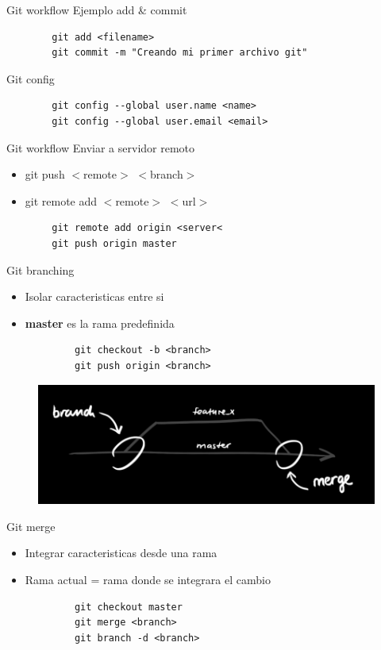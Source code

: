 \documentclass{beamer}
\begin{document}
\begin{frame}[fragile]{Git workflow}
	Ejemplo add \& commit
	\begin{verbatim}
		git add <filename>
		git commit -m "Creando mi primer archivo git"
	\end{verbatim}	
\end{frame}

\begin{frame}[fragile]{Git config}
	\begin{verbatim}
		git config --global user.name <name>
		git config --global user.email <email>
	\end{verbatim}	
\end{frame}


\begin{frame}[fragile]{Git workflow}
	Enviar a servidor remoto
	\begin{itemize}
	\item git push $<$remote$>$ $<$branch$>$
	\item git remote add $<$remote$>$ $<$url$>$
	\end{itemize}
	\begin{verbatim}
		git remote add origin <server<
		git push origin master
	\end{verbatim}
\end{frame}


\begin{frame}[fragile]{Git branching}	
	\begin{itemize}
	\item Isolar caracteristicas entre si
	\item \textbf{master} es la rama predefinida
	\end{itemize}
	\begin{verbatim}
			git checkout -b <branch>
			git push origin <branch>
	\end{verbatim}
	\begin{figure}
			\centering
			\includegraphics[width=0.7\linewidth]{Images/branches}
	\end{figure}
\end{frame}


\begin{frame}[fragile]{Git merge}	
	\begin{itemize}
	\item Integrar caracteristicas desde una rama
	\item Rama actual = rama donde se integrara el cambio
	\end{itemize}
	\begin{verbatim}
			git checkout master
			git merge <branch>
			git branch -d <branch>
	\end{verbatim}
\end{frame}
\end{document}
